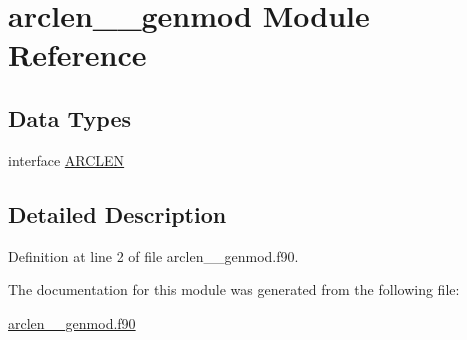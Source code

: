 \hypertarget{classarclen____genmod}{\section{arclen\+\_\+\+\_\+genmod Module Reference}
\label{classarclen____genmod}
}
\subsection*{Data Types}
\begin{DoxyCompactItemize}
\item 
interface \hyperlink{interfacearclen____genmod_1_1ARCLEN}{A\+R\+C\+L\+E\+N}
\end{DoxyCompactItemize}


\subsection{Detailed Description}


Definition at line 2 of file arclen\+\_\+\+\_\+genmod.\+f90.



The documentation for this module was generated from the following file\+:\begin{DoxyCompactItemize}
\item 
\hyperlink{arclen____genmod_8f90}{arclen\+\_\+\+\_\+genmod.\+f90}\end{DoxyCompactItemize}
